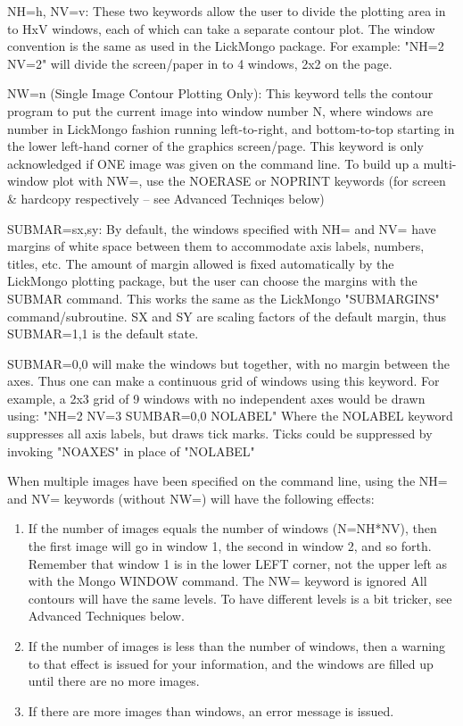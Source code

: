 NH=h, NV=v: These two keywords allow the user to divide the plotting area
in to HxV windows, each of which can take a separate contour plot.  The
window convention is the same as used in the LickMongo package.  For
example: "NH=2 NV=2" will divide the screen/paper in to 4 windows, 2x2 on
the page.
 
NW=n (Single Image Contour Plotting Only): This keyword tells the contour
program to put the current image into window number N, where windows are
number in LickMongo fashion running left-to-right, and bottom-to-top
starting in the lower left-hand corner of the graphics screen/page.  This
keyword is only acknowledged if ONE image was given on the command line.
To build up a multi-window plot with NW=, use the NOERASE or NOPRINT
keywords (for screen \& hardcopy respectively -- see Advanced Techniqes
below)
 
SUBMAR=sx,sy: By default, the windows specified with NH= and NV= have
margins of white space between them to accommodate axis labels, numbers,
titles, etc.  The amount of margin allowed is fixed automatically by the
LickMongo plotting package, but the user can choose the margins with the
SUBMAR command.  This works the same as the LickMongo "SUBMARGINS"
command/subroutine.  SX and SY are scaling factors of the default margin,
thus SUBMAR=1,1 is the default state.
 
SUBMAR=0,0 will make the windows but together, with no margin between the
axes.  Thus one can make a continuous grid of windows using this keyword.
For example, a 2x3 grid of 9 windows with no independent axes would be
drawn using: "NH=2 NV=3 SUMBAR=0,0 NOLABEL" Where the NOLABEL keyword
suppresses all axis labels, but draws tick marks.  Ticks could be
suppressed by invoking "NOAXES" in place of "NOLABEL"
 
When multiple images have been specified on the command line, using the NH=
and NV= keywords (without NW=) will have the following effects:
\begin{enumerate} 
  \item If the number of images equals the number of windows (N=NH*NV),
   then the first image will go in window 1, the second in window 2, and so
   forth.  Remember that window 1 is in the lower LEFT corner, not the
   upper left as with the Mongo WINDOW command.  The NW= keyword is ignored
   All contours will have the same levels.  To have different levels is a
   bit tricker, see Advanced Techniques below.
 
  \item If the number of images is less than the number of windows, then a
  warning to that effect is issued for your information, and the windows
  are filled up until there are no more images.
 
  \item If there are more images than windows, an error message is issued.
\end{enumerate}
 
